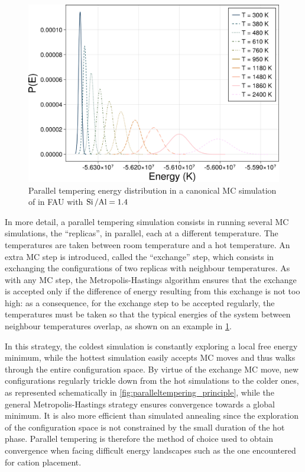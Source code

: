 \documentclass[main.tex]{subfiles}
\begin{document}
\begin{figure}
	\centering
	\includegraphics[width=0.8\linewidth]{figures/cations/paralleltempering.pdf}
	\caption{Parallel tempering energy distribution in a canonical MC simulation of  in FAU with $\mbox{Si\,/Al} = \num{1.4}$}\label{fig:paralleltempering}
\end{figure}

In more detail, a parallel tempering simulation consists in running several MC simulations, the ``replicas'', in parallel, each at a different temperature. The temperatures are taken between room temperature and a hot temperature. An extra MC step is introduced, called the ``exchange'' step, which consists in exchanging the configurations of two replicas with neighbour temperatures. As with any MC step, the Metropolis-Hastings algorithm ensures that the exchange is accepted only if the difference of energy resulting from this exchange is not too high: as a consequence, for the exchange step to be accepted regularly, the temperatures must be taken so that the typical energies of the system between neighbour temperatures overlap, as shown on an example in \cref{fig:paralleltempering}.

In this strategy, the coldest simulation is constantly exploring a local free energy minimum, while the hottest simulation easily accepts MC moves and thus walks through the entire configuration space. By virtue of the exchange MC move, new configurations regularly trickle down from the hot simulations to the colder ones, as represented schematically in \cref{fig:paralleltempering_principle}, while the general Metropolis-Hastings strategy ensures convergence towards a global minimum. It is also more efficient than simulated annealing since the exploration of the configuration space is not constrained by the small duration of the hot phase. Parallel tempering is therefore the method of choice used to obtain convergence when facing difficult energy landscapes such as the one encountered for cation placement.
\end{document}
